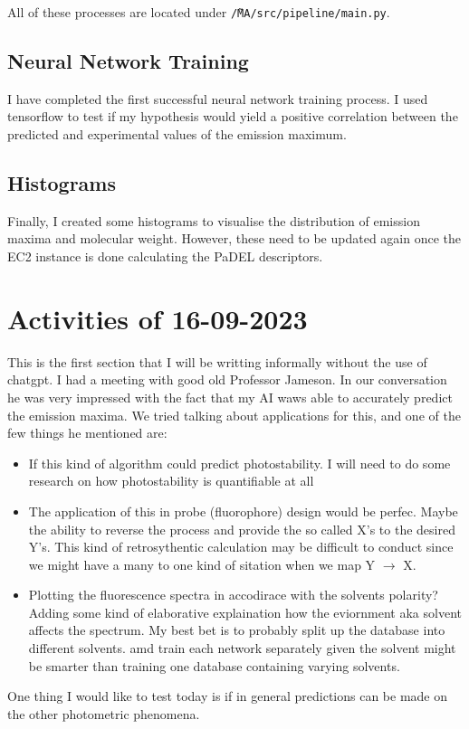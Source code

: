 \documentclass{article}
\begin{document}
All of these processes are located under \texttt{\~/MA/src/pipeline/main.py}.

\subsection*{Neural Network Training}
I have completed the first successful neural network training process. I used tensorflow to test if my hypothesis would yield a positive correlation between the predicted and experimental values of the emission maximum.

\subsection*{Histograms}
Finally, I created some histograms to visualise the distribution of emission maxima and molecular weight. However, these need to be updated again once the EC2 instance is done calculating the PaDEL descriptors.

\section*{Activities of 16-09-2023}
This is the first section that I will be writting informally without the use of chatgpt. I had a meeting with good old Professor Jameson. In our conversation he was very impressed with the fact that my AI waws able to accurately predict the emission maxima. We tried talking about applications for this, and one of the few things he mentioned are:
\begin{itemize}
	\item If this kind of algorithm could predict photostability. I will need to do some research on how photostability is quantifiable at all
	\item The application of this in probe (fluorophore) design would be perfec. Maybe the ability to reverse the process and provide the so called X's to the desired Y's. This kind of retrosythentic calculation may be difficult to conduct since we might have a many to one kind of sitation when we map Y $\rightarrow$ X.
	\item Plotting the fluorescence spectra in accodirace with the solvents polarity? Adding some kind of elaborative explaination how the eviornment aka solvent affects the spectrum. My best bet is to probably split up the database into different solvents. amd train each network separately given the solvent might be smarter than training one database containing varying solvents.
\end{itemize}
One thing I would like to test today is if in general predictions can be made on the other photometric phenomena. 
\end{document}
